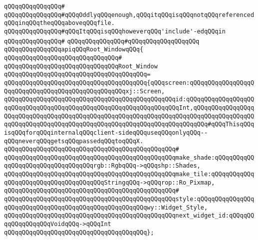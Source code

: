 \verb|qQQqqQQqqQQqqQQq#|\newline
\verb|qQQqqQQqqQQqqQQq#qQQqOddlyqQQqenough,qQQqitqQQqisqQQqnotqQQqreferencedqQQqinqQQqtheqQQqaboveqQQqfile.|\newline
\verb|qQQqqQQqqQQqqQQq#qQQqItqQQqisqQQqhoweverqQQq'include'-edqQQqin|\newline
\verb|qQQqqQQqqQQqqQQq#|\newline
\verb|qQQqqQQqqQQqqQQq#qQQqqQQqqQQqqQQqqQQq|\newline
\newline
\verb|qQQqqQQqqQQqqQQqapiqQQqRoot_WindowqQQq{|\newline
\verb|qQQqqQQqqQQqqQQqqQQqqQQqqQQqqQQq#|\newline
\verb|qQQqqQQqqQQqqQQqqQQqqQQqqQQqqQQqRoot_Window|\newline
\verb|qQQqqQQqqQQqqQQqqQQqqQQqqQQqqQQqqQQqqQQq=|\newline
\verb|qQQqqQQqqQQqqQQqqQQqqQQqqQQqqQQqqQQqqQQq{qQQqscreen:qQQqqQQqqQQqqQQqqQQqqQQqqQQqqQQqqQQqqQQqqQQqqQQqqQQqxj::Screen,|\newline
\verb|qQQqqQQqqQQqqQQqqQQqqQQqqQQqqQQqqQQqqQQqqQQqqQQqid:qQQqqQQqqQQqqQQqqQQqqQQqqQQqqQQqqQQqqQQqqQQqqQQqqQQqqQQqqQQqqQQqqQQqInt,qQQqqQQqqQQqqQQqqQQqqQQqqQQqqQQqqQQqqQQqqQQqqQQqqQQqqQQqqQQqqQQqqQQqqQQqqQQqqQQqqQQqqQQqqQQqqQQqqQQqqQQqqQQqqQQqqQQqqQQqqQQqqQQqqQQqqQQqqQQqqQQq#qQQqThisqQQqisqQQqforqQQqinternalqQQqclient-sideqQQquseqQQqonlyqQQq--qQQqneverqQQqgetsqQQqpassedqQQqtoqQQqX.|\newline
\verb|qQQqqQQqqQQqqQQqqQQqqQQqqQQqqQQqqQQqqQQqqQQqqQQq#|\newline
\verb|qQQqqQQqqQQqqQQqqQQqqQQqqQQqqQQqqQQqqQQqqQQqqQQqmake_shade:qQQqqQQqqQQqqQQqqQQqqQQqqQQqqQQqqQQqrgb::RgbqQQq->qQQqshp::Shades,|\newline
\verb|qQQqqQQqqQQqqQQqqQQqqQQqqQQqqQQqqQQqqQQqqQQqqQQqmake_tile:qQQqqQQqqQQqqQQqqQQqqQQqqQQqqQQqqQQqqQQqStringqQQq->qQQqrop::Ro_Pixmap,|\newline
\verb|qQQqqQQqqQQqqQQqqQQqqQQqqQQqqQQqqQQqqQQqqQQqqQQq#|\newline
\verb|qQQqqQQqqQQqqQQqqQQqqQQqqQQqqQQqqQQqqQQqqQQqqQQqstyle:qQQqqQQqqQQqqQQqqQQqqQQqqQQqqQQqqQQqqQQqqQQqqQQqqQQqqQQqwy::Widget_Style,|\newline
\verb|qQQqqQQqqQQqqQQqqQQqqQQqqQQqqQQqqQQqqQQqqQQqqQQqnext_widget_id:qQQqqQQqqQQqqQQqqQQqVoidqQQq->qQQqInt|\newline
\verb|qQQqqQQqqQQqqQQqqQQqqQQqqQQqqQQqqQQqqQQq};|\newline
